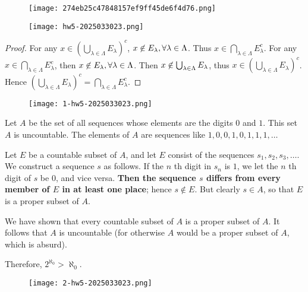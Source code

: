 \begin{figure}[H]
\centering
\texttt{[image: 274eb25c47848157ef9ff45de6f4d76.png]}
\label{}
\end{figure}

\begin{figure}[H]
\centering
\texttt{[image: hw5-2025033023.png]}
\label{}
\end{figure}
\begin{proof}
For any $x\in\left( \bigcup_{\lambda\in\Lambda}E_{\lambda} \right)^{c}$, $x\centernot{\in}E_{\lambda},\forall\lambda\in\Lambda$. Thus $x\in \bigcap_{\lambda\in\Lambda}E_{\lambda}^{c}$. For any $x\in \bigcap_{\lambda\in\Lambda}E_{\lambda}^{c}$, then $x\centernot{\in}E_{\lambda},\forall\lambda\in\Lambda$. Then $x\centernot{\in}\bigcup_{\lambda\in\Lambda}E_{\lambda}$, thus $x\in \left( \bigcup_{\lambda\in\Lambda}E_{\lambda} \right)^{c}$. Hence $\left( \bigcup_{\lambda\in\Lambda}E_{\lambda} \right)^{c}=\bigcap_{\lambda\in\Lambda}E_{\lambda}^{c}$.
\end{proof}
\begin{figure}[H]
\centering
\texttt{[image: 1-hw5-2025033023.png]}
\label{}
\end{figure}

\begin{theorem}
Let $A$ be the set of all sequences whose elements are the digits $0$ and $1$. This set $A$ is uncountable.
The elements of $A$ are sequences like $1,0,0,1,0,1,1,1,\dots$
\end{theorem}
Let $E$ be a countable subset of $A$, and let $E$ consist of the sequences $s_1,s_2,s_3,\dots$. We construct a sequence $s$ as follows. If the $n$ th digit in $s_n$ is $1$, we let the $n$ th digit of $s$ be $0$, and vice versa. \textbf{Then the sequence $s$ differs from every member of $E$ in at least one place}; hence $s\not\in E$. But clearly $s\in A$, so that $E$ is a proper subset of $A$.

We have shown that every countable subset of $A$ is a proper subset of $A$. It follows that $A$ is uncountable (for otherwise $A$ would be a proper subset of $A$, which is absurd).

Therefore, $2^{\aleph_0}>\aleph_0$.

\begin{figure}[H]
\centering
\texttt{[image: 2-hw5-2025033023.png]}
\label{}
\end{figure}

